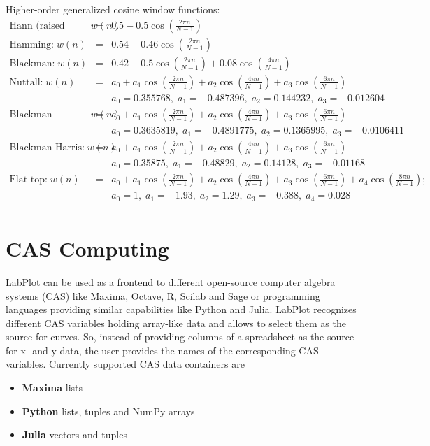 Higher-order generalized cosine window functions:
\begin{eqnarray*}
\text{Hann (raised cosine):} \;  w(n) &=& 0.5 - 0.5 \cos \left(\frac{2 \pi n}{N-1}\right) \\
%
\text{Hamming:} \;  w(n) &=& 0.54 - 0.46 \cos\left( \frac{2\pi n}{N-1} \right) \\
%
\text{Blackman:} \;  w(n) &=& 0.42 - 0.5 \cos\left(\frac{2\pi n}{N-1}\right) + 0.08 \cos\left(\frac{4\pi n}{N-1} \right) \\
%
\text{Nuttall:} \;  w(n) &=& a_0 + a_1 \cos\left(\frac{2\pi n}{N-1}\right) + a_2 \cos\left(\frac{4\pi n}{N-1}\right) + a_3 \cos\left(\frac{6\pi n}{N-1}\right) \\
&& a_0 = 0.355768,\; a_1 =  -0.487396,\; a_2 = 0.144232,\; a_3 = -0.012604 \\
%
\text{Blackman-Nuttall:} \;  w(n) &=& a_0 + a_1 \cos\left(\frac{2\pi n}{N-1}\right) + a_2 \cos\left(\frac{4\pi n}{N-1}\right) + a_3 \cos\left(\frac{6\pi n}{N-1}\right) \\
&& a_0 = 0.3635819,\; a_1 =  -0.4891775,\; a_2 = 0.1365995,\; a_3 = -0.0106411 \\
%
\text{Blackman-Harris:} \;  w(n) &=& a_0 + a_1 \cos\left(\frac{2\pi n}{N-1}\right) + a_2 \cos\left(\frac{4\pi n}{N-1}\right) + a_3 \cos\left(\frac{6\pi n}{N-1}\right) \\
&& a_0 = 0.35875,\; a_1 =  -0.48829,\; a_2 = 0.14128,\; a_3 = -0.01168 \\
%
\text{Flat top:} \;  w(n) &=& a_0 + a_1 \cos\left(\frac{2\pi n}{N-1}\right) + a_2 \cos\left(\frac{4\pi n}{N-1}\right) +a_3 \cos\left(\frac{6\pi n}{N-1}\right) + a_4 \cos\left(\frac{8\pi n}{N-1}\right); \\
&& a_0 = 1, \; a_1 =  -1.93,\; a_2 = 1.29,\; a_3 = -0.388,\; a_4 = 0.028 \\
\end{eqnarray*}


\chapter{CAS Computing}\label{ch:cas_computing}
LabPlot can be used as a frontend to different open-source computer algebra systems (CAS) like Maxima, Octave, R, Scilab and Sage  or programming languages providing similar capabilities like Python and Julia. LabPlot recognizes different CAS variables holding array-like data and allows to select them as the source for curves. So, instead of providing columns of a spreadsheet as the source for x- and y-data, the user provides the names of the corresponding CAS-variables. Currently supported CAS data containers are
\begin{itemize}
\item \textbf{Maxima} lists
\item \textbf{Python} lists, tuples and NumPy arrays
\item \textbf{Julia} vectors and tuples
\end{itemize}

